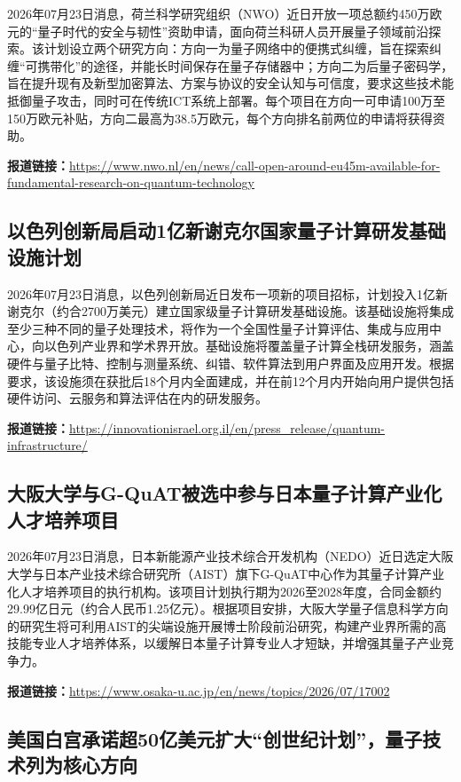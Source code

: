 \documentclass[12pt,a4paper]{ctexart}
\begin{document}
2026年07月23日消息，荷兰科学研究组织（NWO）近日开放一项总额约450万欧元的“量子时代的安全与韧性”资助申请，面向荷兰科研人员开展量子领域前沿探索。该计划设立两个研究方向：方向一为量子网络中的便携式纠缠，旨在探索纠缠“可携带化”的途径，并能长时间保存在量子存储器中；方向二为后量子密码学，旨在提升现有及新型加密算法、方案与协议的安全认知与可信度，要求这些技术能抵御量子攻击，同时可在传统ICT系统上部署。每个项目在方向一可申请100万至150万欧元补贴，方向二最高为38.5万欧元，每个方向排名前两位的申请将获得资助。

\noindent\textbf{报道链接：}\url{https://www.nwo.nl/en/news/call-open-around-eu45m-available-for-fundamental-research-on-quantum-technology}

\subsection{ 以色列创新局启动1亿新谢克尔国家量子计算研发基础设施计划 }

2026年07月23日消息，以色列创新局近日发布一项新的项目招标，计划投入1亿新谢克尔（约合2700万美元）建立国家级量子计算研发基础设施。该基础设施将集成至少三种不同的量子处理技术，将作为一个全国性量子计算评估、集成与应用中心，向以色列产业界和学术界开放。基础设施将覆盖量子计算全栈研发服务，涵盖硬件与量子比特、控制与测量系统、纠错、软件算法到用户界面及应用开发。根据要求，该设施须在获批后18个月内全面建成，并在前12个月内开始向用户提供包括硬件访问、云服务和算法评估在内的研发服务。

\noindent\textbf{报道链接：}\url{https://innovationisrael.org.il/en/press\_release/quantum-infrastructure/}

\subsection{ 大阪大学与G-QuAT被选中参与日本量子计算产业化人才培养项目 }

2026年07月23日消息，日本新能源产业技术综合开发机构（NEDO）近日选定大阪大学与日本产业技术综合研究所（AIST）旗下G-QuAT中心作为其量子计算产业化人才培养项目的执行机构。该项目计划执行期为2026至2028年度，合同金额约29.99亿日元（约合人民币1.25亿元）。根据项目安排，大阪大学量子信息科学方向的研究生将可利用AIST的尖端设施开展博士阶段前沿研究，构建产业界所需的高技能专业人才培养体系，以缓解日本量子计算专业人才短缺，并增强其量子产业竞争力。

\noindent\textbf{报道链接：}\url{https://www.osaka-u.ac.jp/en/news/topics/2026/07/17002}

\subsection{ 美国白宫承诺超50亿美元扩大“创世纪计划”，量子技术列为核心方向 }
\end{document}
